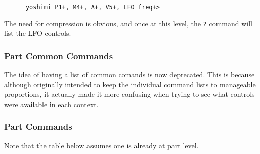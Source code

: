    \begin{verbatim}
      yoshimi P1+, M4+, A+, V5+, LFO freq+>
   \end{verbatim}

   The need for compression is obvious, and once at this level, the
   \texttt{?} command will list the LFO controls.

\subsubsection{Part Common Commands}
\label{subsec:command_line_part_common_commands}
The idea of having a list of common comands is now deprecated. This is
because although originally intended to keep the individual command lists to
manageable proportions, it actually made it more confusing when trying
to see what controls were available in each context.

\subsubsection{Part Commands}
\label{subsec:command_line_part_commands}

   Note that the table below assumes one is already at part level.

